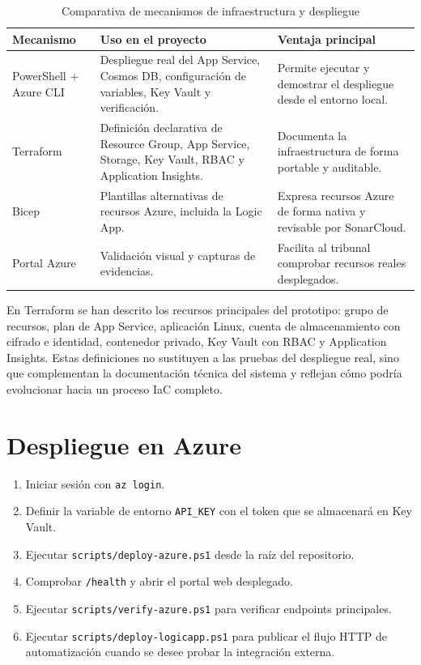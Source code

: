 \begin{table}[h]
\centering
\scriptsize
\renewcommand{\arraystretch}{0.9}
\begin{tabularx}{\textwidth}{l X X}
\textbf{Mecanismo} & \textbf{Uso en el proyecto} & \textbf{Ventaja principal} \\
\hline
PowerShell + Azure CLI & Despliegue real del App Service, Cosmos DB, configuración de variables, Key Vault y verificación. & Permite ejecutar y demostrar el despliegue desde el entorno local. \\
Terraform & Definición declarativa de Resource Group, App Service, Storage, Key Vault, RBAC y Application Insights. & Documenta la infraestructura de forma portable y auditable. \\
Bicep & Plantillas alternativas de recursos Azure, incluida la Logic App. & Expresa recursos Azure de forma nativa y revisable por SonarCloud. \\
Portal Azure & Validación visual y capturas de evidencias. & Facilita al tribunal comprobar recursos reales desplegados. \\
\end{tabularx}
\caption{Comparativa de mecanismos de infraestructura y despliegue}
\label{tabla:iac_comparativa}
\end{table}

En Terraform se han descrito los recursos principales del prototipo: grupo de recursos, plan de App Service, aplicación Linux, cuenta de almacenamiento con cifrado e identidad, contenedor privado, Key Vault con RBAC y Application Insights. Estas definiciones no sustituyen a las pruebas del despliegue real, sino que complementan la documentación técnica del sistema y reflejan cómo podría evolucionar hacia un proceso IaC completo.
\section{Despliegue en Azure}

\begin{enumerate}
    \item Iniciar sesión con \texttt{az login}.
    \item Definir la variable de entorno \texttt{API\_KEY} con el token que se almacenará en Key Vault.
    \item Ejecutar \texttt{scripts/deploy-azure.ps1} desde la raíz del repositorio.
    \item Comprobar \texttt{/health} y abrir el portal web desplegado.
    \item Ejecutar \texttt{scripts/verify-azure.ps1} para verificar endpoints principales.
    \item Ejecutar \texttt{scripts/deploy-logicapp.ps1} para publicar el flujo HTTP de automatización cuando se desee probar la integración externa.
\end{enumerate}

